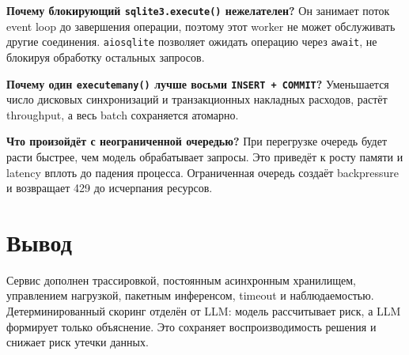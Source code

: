 \documentclass[12pt,a4paper]{article}
\newcommand{\code}[1]{\texttt{#1}}
\begin{document}
\textbf{Почему блокирующий \code{sqlite3.execute()} нежелателен?}
Он занимает поток event loop до завершения операции, поэтому этот worker не
может обслуживать другие соединения. \code{aiosqlite} позволяет ожидать
операцию через \code{await}, не блокируя обработку остальных запросов.

\textbf{Почему один \code{executemany()} лучше восьми \code{INSERT + COMMIT}?}
Уменьшается число дисковых синхронизаций и транзакционных накладных расходов,
растёт throughput, а весь batch сохраняется атомарно.

\textbf{Что произойдёт с неограниченной очередью?}
При перегрузке очередь будет расти быстрее, чем модель обрабатывает запросы.
Это приведёт к росту памяти и latency вплоть до падения процесса. Ограниченная
очередь создаёт backpressure и возвращает 429 до исчерпания ресурсов.

\section{Вывод}

Сервис дополнен трассировкой, постоянным асинхронным хранилищем, управлением
нагрузкой, пакетным инференсом, timeout и наблюдаемостью. Детерминированный
скоринг отделён от LLM: модель рассчитывает риск, а LLM формирует только
объяснение. Это сохраняет воспроизводимость решения и снижает риск утечки
данных.
\end{document}

